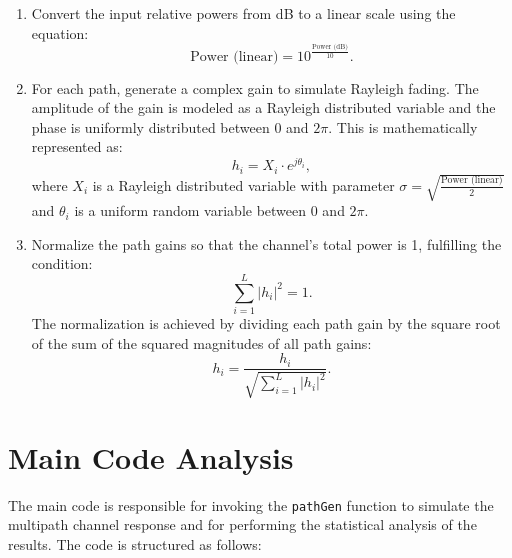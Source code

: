 \documentclass[12pt]{article}
\begin{document}
\begin{enumerate}
    \item Convert the input relative powers from dB to a linear scale using the equation:
    \[ \text{Power (linear)} = 10^{\frac{\text{Power (dB)}}{10}}. \]

    \item For each path, generate a complex gain to simulate Rayleigh fading. The amplitude of the gain is modeled as a Rayleigh distributed variable and the phase is uniformly distributed between 0 and \( 2\pi \). This is mathematically represented as:
    \[ h_i = X_i \cdot e^{j\theta_i}, \]
    where \( X_i \) is a Rayleigh distributed variable with parameter \( \sigma = \sqrt{\frac{\text{Power (linear)}}{2}} \) and \( \theta_i \) is a uniform random variable between 0 and \( 2\pi \).

    \item Normalize the path gains so that the channel's total power is 1, fulfilling the condition:
    \[ \sum_{i=1}^{L} |h_i|^2 = 1. \]
    The normalization is achieved by dividing each path gain by the square root of the sum of the squared magnitudes of all path gains:
    \[ h_i = \frac{h_i}{\sqrt{\sum_{i=1}^{L} |h_i|^2}}. \]
\end{enumerate}

\section{Main Code Analysis}
The main code is responsible for invoking the \texttt{pathGen} function to simulate the multipath channel response and for performing the statistical analysis of the results. The code is structured as follows:
\end{document}
